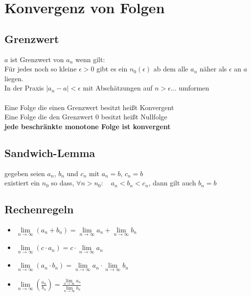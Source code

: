 \documentclass[12pt,a4paper]{article}
\begin{document}
\pagebreak
\section{Konvergenz von Folgen}
\subsection{Grenzwert}
$a$ ist Grenzwert von $a_n$ wenn gilt:\\
Für jedes noch so kleine $\epsilon>0$ gibt es ein $n_0(\epsilon)$ ab dem alle $a_n$ näher als $\epsilon$ an $a$ liegen.\\
In der Praxis $|a_n-a|<\epsilon$ mit Abschätzungen auf $n>\epsilon...$ umformen\\\\
Eine Folge die einen Grenzwert besitzt heißt Konvergent\\
Eine Folge die den Grenzwert 0 besitzt heißt Nullfolge\\
\textbf{jede beschränkte monotone Folge ist konvergent}

\subsection{Sandwich-Lemma}
gegeben seien $a_n$, $b_n$ und $c_n$ mit $a_n = b$, $c_n = b$\\
existiert ein $n_0$ so dass, $\forall n>n_0:\quad a_n<b_n<c_n$, dann gilt auch $b_n=b$

\subsection{Rechenregeln}
\begin{itemize}
	\item $\lim\limits_{n\rightarrow \infty} (a_n+b_n)=\lim\limits_{n\rightarrow \infty}a_n+\lim\limits_{n\rightarrow \infty}b_n$
	\item $\lim\limits_{n\rightarrow \infty} (c\cdot a_n)=c\cdot\lim\limits_{n\rightarrow \infty}a_n$
	\item $\lim\limits_{n\rightarrow \infty} (a_n\cdot b_n)=\lim\limits_{n\rightarrow \infty}a_n\cdot\lim\limits_{n\rightarrow \infty}b_n$
	\item $\lim\limits_{n\rightarrow \infty} (\frac{a_n}{b_n})=\frac{\lim\limits_{n\rightarrow \infty}a_n}{\lim\limits_{n\rightarrow \infty}b_n}$
\end{itemize}
\end{document}
